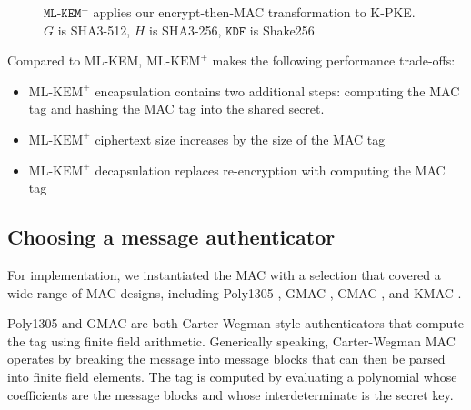 \documentclass[journal=tches,submission]{iacrtrans}
\def\mlkemplus{\text{ML-KEM}^+}
\begin{document}
\begin{figure}[h]
    \caption{$\texttt{ML-KEM}^+$ applies our encrypt-then-MAC transformation to K-PKE. $G$ is SHA3-512, $H$ is SHA3-256, $\texttt{KDF}$ is Shake256}\label{fig:ml-kem-plus-routines}
\end{figure}

Compared to ML-KEM, $\mlkemplus$ makes the following performance trade-offs: \begin{itemize}
    \item $\mlkemplus$ encapsulation contains two additional steps: computing the MAC tag and hashing the MAC tag into the shared secret.
    \item $\mlkemplus$ ciphertext size increases by the size of the MAC tag
    \item $\mlkemplus$ decapsulation replaces re-encryption with computing the MAC tag
\end{itemize}

\subsection{Choosing a message authenticator}\label{sec:choosing-a-message-authenticator}
For implementation, we instantiated the MAC with a selection that covered a wide range of MAC designs, including Poly1305 \cite{bernstein2005poly1305}, GMAC \cite{mcgrew2004galois}, CMAC \cite{iwata2003omac}\cite{black2000cbc}, and KMAC \cite{SP80053r4}. 


Poly1305 and GMAC are both Carter-Wegman style authenticators \cite{wegman1981new} that compute the tag using finite field arithmetic. Generically speaking, Carter-Wegman MAC operates by breaking the message into message blocks that can then be parsed into finite field elements. The tag is computed by evaluating a polynomial whose coefficients are the message blocks and whose interdeterminate is the secret key.
\end{document}
